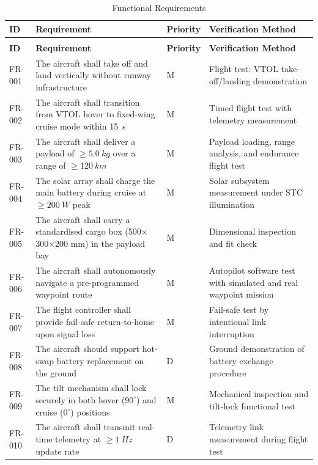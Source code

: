 \begin{longtable}{>{\raggedright\arraybackslash}p{1.4cm}
                  >{\raggedright\arraybackslash}p{7.2cm}
                  >{\centering\arraybackslash}p{1.6cm}
                  >{\raggedright\arraybackslash}p{4cm}}
\caption{Functional Requirements} \label{tab:FR} \\
\toprule
\textbf{ID} & \textbf{Requirement} & \textbf{Priority} & \textbf{Verification Method} \\
\midrule
\endfirsthead
\multicolumn{4}{c}{\tablename\ \thetable{} (continued)} \\
\toprule
\textbf{ID} & \textbf{Requirement} & \textbf{Priority} & \textbf{Verification Method} \\
\midrule
\endhead
\bottomrule
\endfoot
FR-001 & The aircraft shall take off and land vertically without runway infrastructure & M & Flight test: VTOL take-off/landing demonstration \\
FR-002 & The aircraft shall transition from VTOL hover to fixed-wing cruise mode within \SI{15}{s} & M & Timed flight test with telemetry measurement \\
FR-003 & The aircraft shall deliver a payload of $\geq \SI{5.0}{kg}$ over a range of $\geq \SI{120}{km}$ & M & Payload loading, range analysis, and endurance flight test \\
FR-004 & The solar array shall charge the main battery during cruise at $\geq \SI{200}{W}$ peak & M & Solar subsystem measurement under STC illumination \\
FR-005 & The aircraft shall carry a standardised cargo box (500$\times$300$\times$200 mm) in the payload bay & M & Dimensional inspection and fit check \\
FR-006 & The aircraft shall autonomously navigate a pre-programmed waypoint route & M & Autopilot software test with simulated and real waypoint mission \\
FR-007 & The flight controller shall provide fail-safe return-to-home upon signal loss & M & Fail-safe test by intentional link interruption \\
FR-008 & The aircraft should support hot-swap battery replacement on the ground & D & Ground demonstration of battery exchange procedure \\
FR-009 & The tilt mechanism shall lock securely in both hover ($90^\circ$) and cruise ($0^\circ$) positions & M & Mechanical inspection and tilt-lock functional test \\
FR-010 & The aircraft shall transmit real-time telemetry at $\geq \SI{1}{Hz}$ update rate & D & Telemetry link measurement during flight test \\
\end{longtable}

